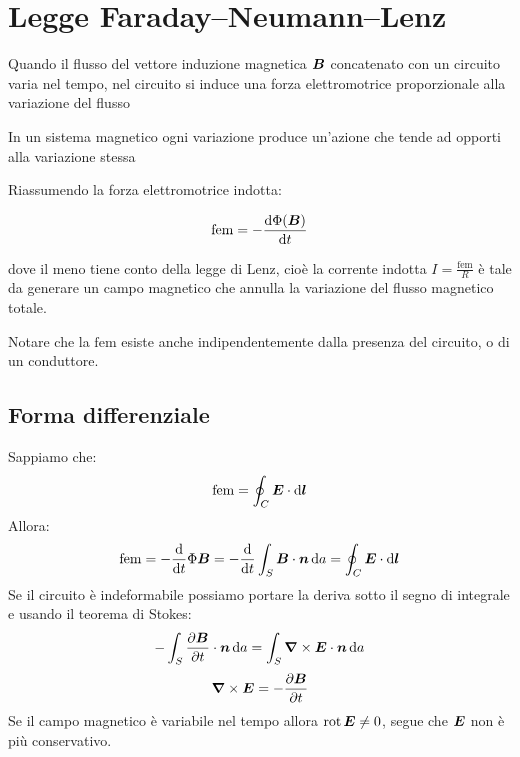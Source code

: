 \section{Legge Faraday--Neumann--Lenz}
\begin{legge}
Quando il flusso del vettore induzione magnetica $\boldsymbol{B}$ concatenato con un circuito varia nel tempo, nel circuito si induce una forza elettromotrice proporzionale alla variazione del flusso
\end{legge}
\begin{legge}[Lenz]
In un sistema magnetico ogni variazione produce un'azione che tende ad opporti alla variazione stessa
\end{legge}
Riassumendo la forza elettromotrice indotta:
\begin{legge}
\begin{equation}
\mathrm{fem}=-\frac{\mathrm{d}\Phi(\boldsymbol{B})}{\mathrm{d} t}
\end{equation}
\end{legge}
dove il meno tiene conto della legge di Lenz, cioè la corrente indotta $I=\frac{\mathrm{fem}}{R}$ è tale da generare un campo magnetico che annulla la variazione del flusso magnetico totale.

Notare che la $\mathrm{fem}$ esiste anche indipendentemente dalla presenza del circuito, o di un conduttore.
\subsection{Forma differenziale}
Sappiamo che:
\begin{equation}
\mathrm{fem}=\oint_C\boldsymbol{E}\cdot\mathrm{d}\boldsymbol{l}
\end{equation}
Allora:
\begin{equation}
\mathrm{fem}=-\frac{\mathrm{d}}{\mathrm{d} t}\Phi{\boldsymbol{B}}=-\frac{\mathrm{d}}{\mathrm{d} t}\int_S\boldsymbol{B}\cdot\boldsymbol{n}\,\mathrm{d} a=\oint_C\boldsymbol{E}\cdot\mathrm{d} \boldsymbol{l}
\end{equation}
Se il circuito è indeformabile possiamo portare la deriva sotto il segno di integrale e usando il teorema di Stokes:
\begin{equation}
-\int_S\frac{\partial\boldsymbol{B}}{\partial t}\cdot\boldsymbol{n}\,\mathrm{d} a=\int_S\boldsymbol{\nabla}\times\boldsymbol{E}\cdot\boldsymbol{n}\,\mathrm{d} a
\end{equation}
\begin{equation}
\boldsymbol{\nabla}\times\boldsymbol{E}=-\frac{\partial\boldsymbol{B}}{\partial t}
\end{equation}
Se il campo magnetico è variabile nel tempo allora $\operatorname{rot}\boldsymbol{E}\neq 0$, segue che $\boldsymbol{E}$ non è più conservativo.
